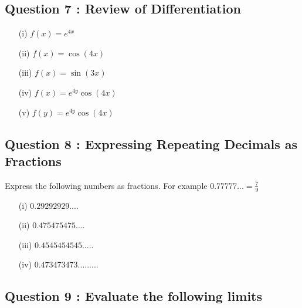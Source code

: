 \documentclass[]{article}
\begin{document}
\subsection*{Question 7 : Review of Differentiation}
\begin{multicols}{2}
\begin{itemize}
\item[(i)] $f(x) = e^{4x}$
\item[(ii)] $f(x) = \cos(4x)$
\item[(iii)] $f(x) = \sin(3x)$
\item[(iv)] $f(x) = e^{4y} \cos(4x)$
\item[(v)] $f(y) = e^{4y} \cos(4x)$
\end{itemize}
\end{multicols}

\subsection*{Question 8 : Expressing Repeating Decimals as Fractions}
Express the following numbers as fractions. For example $ 0.77777... = \frac{7}{9}$

\begin{multicols}{2}
	\begin{itemize}
		\item[(i)] $0.29292929....$
		\item[(ii)] $0.475475475....$
		
		\item[(iii)] $0.4545454545.....$
		\item[(iv)] $0.473473473.........$
	\end{itemize} 
\end{multicols}

\newpage

\subsection*{Question 9 : Evaluate the following limits}
\end{document}
